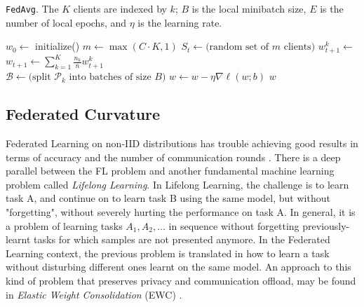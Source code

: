 \algrenewcommand\algorithmicfunction{}
\algrenewcommand\textproc{}
\begin{algorithm}[H]
\caption{\texttt{FedAvg}. The $K$ clients are indexed by $k$; $B$ is the local minibatch size, $E$ is the number of local epochs, and $\eta$ is the learning rate.}\label{alg:fedavg}
\begin{algorithmic}[1]
    \State $w_0\leftarrow$ initialize()
        \State $m\leftarrow \max(C\cdot K, 1)$
        \State $S_t\leftarrow \text{(random set of $m$ clients)}$
            \State $w_{t+1}^k\leftarrow$ 
        \EndFor
        \State $w_{t+1}\leftarrow \sum_{k=1}^K\frac{n_k}{n}w_{t+1}^k$
    \EndFor
\EndFunction
\\
    \State $\mathcal{B}\leftarrow \text{(split $\mathcal{P}_k$ into batches of size $B$)}$
            \State $w\leftarrow w-\eta\nabla\ell(w;b)$
        \EndFor
    \EndFor
    \Return $w$
\EndFunction
\end{algorithmic}
\end{algorithm}


\subsection{Federated Curvature}\label{sec:fedcurv}

Federated Learning on non-IID distributions has trouble achieving good results in terms of accuracy and the number of communication rounds \cite{mcmahan2017communication}. There is a deep parallel between the FL problem and another fundamental machine learning problem called \textit{Lifelong Learning}. In Lifelong Learning, the challenge is to learn task A, and continue on to learn task B using the same model, but without "forgetting", without severely hurting the performance on task A. In general, it is a problem of learning tasks $A_1, A_2, \dots$ in sequence without forgetting previously-learnt tasks for which samples are not presented anymore. In the Federated Learning context, the previous problem is translated in how to learn a task without disturbing different ones learnt on the same model. An approach to this kind of problem that preserves privacy and communication offload, may be found in \textit{Elastic Weight Consolidation} (EWC) \cite{kirkpatrick2017overcoming}. \\

